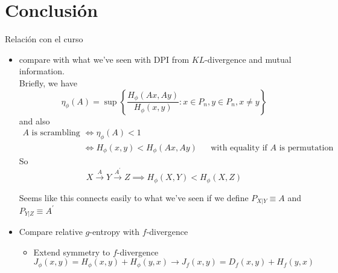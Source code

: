 \documentclass[11pt]{article}
\begin{document}
\section{Conclusión}
Relación con el curso
\begin{itemize}
    \item compare with what we've seen with DPI from $KL$-divergence and mutual information. \\ Briefly, we have
    \[\eta_{\phi}(A) = \sup \left\{\frac{H_{\phi}(Ax,Ay)}{H_{\phi}(x,y)}: x\in P_n, y\in P_n, x \neq y\right\}\]
    and also
    \begin{align*}
        A \text{ is scrambling } &\iff \eta_{\phi}(A) < 1 \\
        &\iff H_{\phi}(x,y) < H_{\phi}(Ax,Ay) &&\text{with equality if $A$ is permutation}
    \end{align*}
    So 
    \[X \xrightarrow{A} Y \xrightarrow{A^\prime} Z \implies H_{\phi}(X,Y) < H_{\phi}(X,Z)\]
    
    Seems like this connects easily to what we've seen if we define $P_{X|Y} \equiv A$ and $P_{Y|Z} \equiv A^\prime$
    \item Compare relative $g$-entropy with $f$-divergence
    \begin{itemize}
        \item Extend symmetry to $f$-divergence
        \[J_{\phi}(x,y) = H_{\phi}(x,y) + H_{\phi}(y,x) \longrightarrow J_{f}(x,y) = D_f(x,y) + H_f(y,x)\]
    \end{itemize}
\end{itemize}

\end{document}
